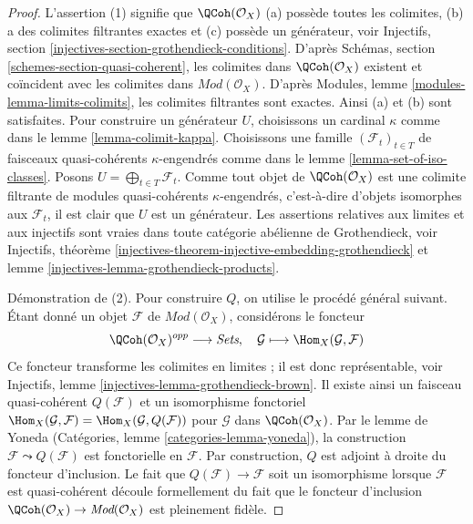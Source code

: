 \begin{proof}
L'assertion (1) signifie que $\QCoh(\mathcal{O}_X)$ (a) possède toutes les colimites,
(b) a des colimites filtrantes exactes et (c) possède un générateur, voir
Injectifs, section \ref{injectives-section-grothendieck-conditions}.
D'après Schémas, section \ref{schemes-section-quasi-coherent},
les colimites dans $\QCoh(\mathcal{O}_X)$ existent et coïncident
avec les colimites dans $\textit{Mod}(\mathcal{O}_X)$. D'après
Modules, lemme \ref{modules-lemma-limits-colimits},
les colimites filtrantes sont exactes. Ainsi (a) et (b) sont satisfaites.
Pour construire un générateur $U$, choisissons un cardinal $\kappa$ comme dans le
lemme \ref{lemma-colimit-kappa}. Choisissons une famille
$(\mathcal{F}_t)_{t \in T}$ de faisceaux quasi-cohérents $\kappa$-engendrés comme dans le
lemme \ref{lemma-set-of-iso-classes}. Posons
$U = \bigoplus_{t \in T} \mathcal{F}_t$. Comme tout objet de
$\QCoh(\mathcal{O}_X)$ est une colimite filtrante de modules quasi-cohérents
$\kappa$-engendrés, c'est-à-dire d'objets isomorphes aux $\mathcal{F}_t$,
il est clair que $U$ est un générateur.
Les assertions relatives aux limites et aux injectifs sont vraies dans toute
catégorie abélienne de Grothendieck, voir
Injectifs, théorème
\ref{injectives-theorem-injective-embedding-grothendieck} et
lemme \ref{injectives-lemma-grothendieck-products}.

\medskip\noindent
Démonstration de (2). Pour construire $Q$, on utilise le procédé général suivant.
Étant donné un objet $\mathcal{F}$ de $\textit{Mod}(\mathcal{O}_X)$,
considérons le foncteur
$$
\QCoh(\mathcal{O}_X)^{opp} \longrightarrow \textit{Sets},\quad
\mathcal{G} \longmapsto \Hom_X(\mathcal{G}, \mathcal{F})
$$
Ce foncteur transforme les colimites en limites ;
il est donc représentable, voir
Injectifs, lemme \ref{injectives-lemma-grothendieck-brown}.
Il existe ainsi un faisceau quasi-cohérent $Q(\mathcal{F})$
et un isomorphisme fonctoriel
$\Hom_X(\mathcal{G}, \mathcal{F}) = \Hom_X(\mathcal{G}, Q(\mathcal{F}))$
pour $\mathcal{G}$ dans $\QCoh(\mathcal{O}_X)$. Par le lemme de Yoneda
(Catégories, lemme \ref{categories-lemma-yoneda}),
la construction $\mathcal{F} \leadsto Q(\mathcal{F})$ est
fonctorielle en $\mathcal{F}$. Par construction, $Q$ est adjoint à droite
du foncteur d'inclusion.
Le fait que $Q(\mathcal{F}) \to \mathcal{F}$ soit un isomorphisme
lorsque $\mathcal{F}$ est quasi-cohérent découle formellement du fait
que le foncteur d'inclusion
$\QCoh(\mathcal{O}_X) \to \textit{Mod}(\mathcal{O}_X)$
est pleinement fidèle.
\end{proof}
